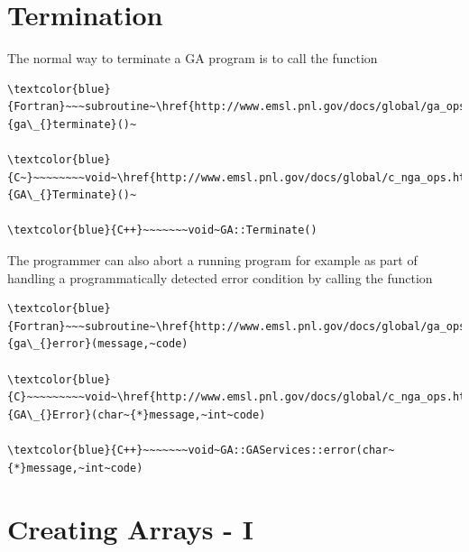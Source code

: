 \section{Termination }

The normal way to terminate a GA program is to call the function
\begin{verbatim}
\textcolor{blue}{Fortran}~~~subroutine~\href{http://www.emsl.pnl.gov/docs/global/ga_ops.html\#ga_terminate}{ga\_{}terminate}()~

\textcolor{blue}{C~}~~~~~~~~void~\href{http://www.emsl.pnl.gov/docs/global/c_nga_ops.html\#ga_initialize}{GA\_{}Terminate}()~

\textcolor{blue}{C++}~~~~~~~void~GA::Terminate()
\end{verbatim}
The programmer can also abort a running program for example as part
of handling a programmatically detected error condition by calling
the function
\begin{verbatim}
\textcolor{blue}{Fortran}~~~subroutine~\href{http://www.emsl.pnl.gov/docs/global/ga_ops.html\#ga_error}{ga\_{}error}(message,~code)

\textcolor{blue}{C}~~~~~~~~~void~\href{http://www.emsl.pnl.gov/docs/global/c_nga_ops.html\#ga_error}{GA\_{}Error}(char~{*}message,~int~code)

\textcolor{blue}{C++}~~~~~~~void~GA::GAServices::error(char~{*}message,~int~code)
\end{verbatim}

\section{Creating Arrays - I }

